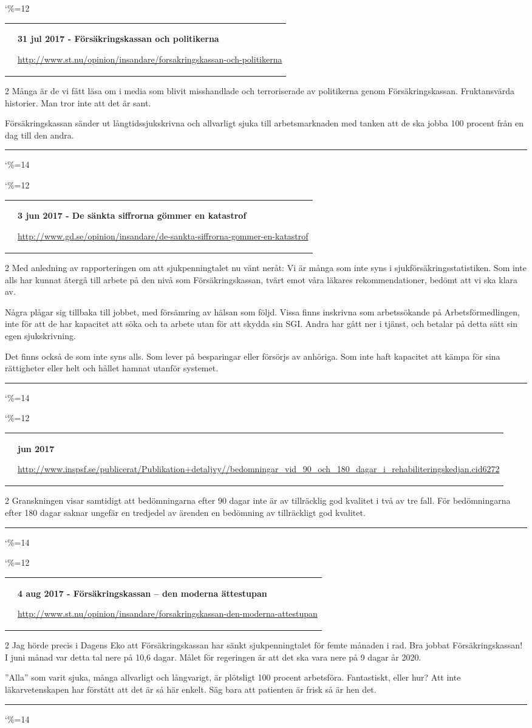 \documentclass[a4paper]{article}
\makeatletter
\newcommand{\entry}{
\catcode`\%=12
\@entry}
\newcommand{\@entry}[4][]{
\bigskip
\begin{tabular*}{\textwidth}{l m{\textwidth-4cm}}
\qrcode{#4} & \textbf{#2}

\medskip

\url{#4}

\end{tabular*}

\medskip


\begin{multicols}{2}
#3
\end{multicols}

#1

\medskip
\hrule

\catcode`\%=14
}
\makeatother
\begin{document}
\entry{31 jul 2017 - Försäkringskassan och politikerna}{Många är de vi fått läsa om i media som blivit misshandlade och terroriserade av politikerna genom Försäkringskassan. Fruktansvärda historier. Man tror inte att det är sant.

Försäkringskassan sänder ut långtidssjukskrivna och allvarligt sjuka till arbetsmarknaden med tanken att de ska jobba 100 procent från en dag till den andra.}{http://www.st.nu/opinion/insandare/forsakringskassan-och-politikerna}


\entry{3 jun 2017 - De sänkta siffrorna gömmer en katastrof}{Med anledning av rapporteringen om att sjukpenningtalet nu vänt neråt: Vi är många som inte syns i sjukförsäkringsstatistiken. Som inte alls har kunnat återgå till arbete på den nivå som Försäkringskassan, tvärt emot våra läkares rekommendationer, bedömt att vi ska klara av.

Några plågar sig tillbaka till jobbet, med försämring av hälsan som följd. Vissa finns inskrivna som arbetssökande på Arbetsförmedlingen, inte för att de har kapacitet att söka och ta arbete utan för att skydda sin SGI. Andra har gått ner i tjänst, och betalar på detta sätt sin egen sjukskrivning.

Det finns också de som inte syns alls. Som lever på besparingar eller försörjs av anhöriga. Som inte haft kapacitet att kämpa för sina rättigheter eller helt och hållet hamnat utanför systemet.}{http://www.gd.se/opinion/insandare/de-sankta-siffrorna-gommer-en-katastrof}

\entry{jun 2017}{Granskningen visar samtidigt att bedömningarna efter 90 dagar inte är av tillräcklig god kvalitet i två av tre fall. För bedömningarna efter 180 dagar saknar ungefär en tredjedel av ärenden en bedömning av tillräckligt god kvalitet.}{http://www.inspsf.se/publicerat/Publikation+detaljvy//bedomningar_vid_90_och_180_dagar_i_rehabiliteringskedjan.cid6272}


\entry{4 aug 2017 - Försäkringskassan – den moderna ättestupan}{Jag hörde precis i Dagens Eko att Försäkringskassan har sänkt sjukpenningtalet för femte månaden i rad. Bra jobbat Försäkringskassan! I juni månad var detta tal nere på 10,6 dagar. Målet för regeringen är att det ska vara nere på 9 dagar år 2020.

”Alla” som varit sjuka, många allvarligt och långvarigt, är plötsligt 100 procent arbetsföra. Fantastiskt, eller hur? Att inte läkarvetenskapen har förstått att det är så här enkelt. Säg bara att patienten är frisk så är hen det.}{http://www.st.nu/opinion/insandare/forsakringskassan-den-moderna-attestupan}
\end{document}
